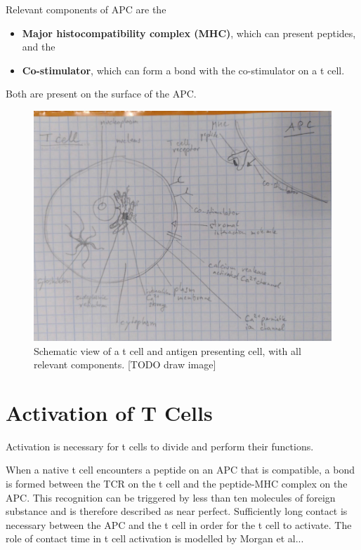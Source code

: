 Relevant components of APC are the
\begin{itemize}
	\item \textbf{Major histocompatibility complex (MHC)}, which can present peptides, and the
	\item \textbf{Co-stimulator}, which can form a bond with the co-stimulator on a t cell.
\end{itemize}

Both are present on the surface of the APC.

\begin{figure}
	\centering
	\includegraphics[width=\linewidth]{fig/tmp_t_cell_components}
	\caption{Schematic view of a t cell and antigen presenting cell, with all relevant components. [TODO draw image]}
	\label{fig:tcellcomponents}
\end{figure}

\section{Activation of T Cells}
\label{sec:t-cell/activation}

Activation is necessary for t cells to divide and perform their functions.\cite{Ganong1997}

When a native t cell encounters a peptide on an APC that is compatible, a bond is formed between the TCR on the t cell and the peptide-MHC complex on the APC. This recognition can be triggered by less than ten molecules of foreign substance and is therefore described as near perfect. Sufficiently long contact is necessary between the APC and the t cell in order for the t cell to activate. The role of contact time in t cell activation is modelled by Morgan et al..\cite{morgan2023}.


